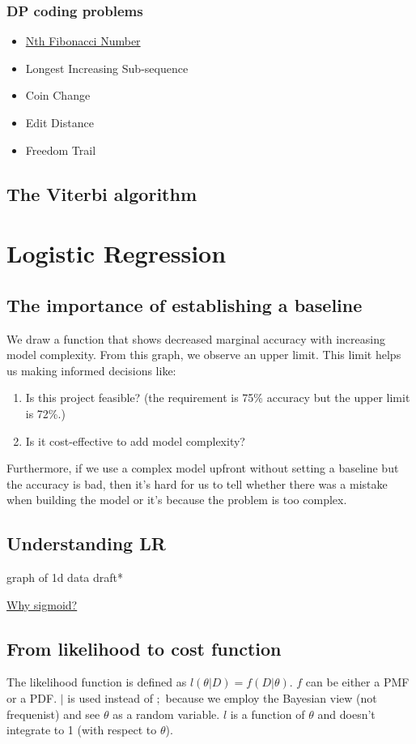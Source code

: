 \documentclass{report}
\begin{document}
  \subsection{DP coding problems}
  \begin{itemize}
	  \item \href{https://github.com/SantiDu/DSA/blob/main/DM-fibonacci_number.py}{Nth Fibonacci Number}
    \item Longest Increasing Sub-sequence
    \item Coin Change
    \item Edit Distance
    \item Freedom Trail
  \end{itemize}
  \section{The Viterbi algorithm}
  \chapter{Logistic Regression}
  \section{The importance of establishing a baseline}
  We draw a function that shows decreased marginal accuracy with increasing model complexity. From this graph, we observe an upper limit. This limit helps us making informed decisions like:
		\begin{enumerate}
			\item Is this project feasible? (the requirement is 75\% accuracy but the upper limit is 72\%.)
			\item Is it cost-effective to add model complexity?
		\end{enumerate}
Furthermore, if we use a complex model upfront without setting a baseline but the accuracy is bad, then it's hard for us to tell whether there was a mistake when building the model or it's because the problem is too complex.

  \section{Understanding LR}
  graph of 1d data draft*

  \href{https://towardsdatascience.com/why-sigmoid-a-probabilistic-perspective-42751d82686}{Why sigmoid?}
  \section{From likelihood to cost function}
  The likelihood function is defined as $l\left( \theta|D \right) = f\left( D|\theta\right) $. $f$ can be either a PMF or a PDF. $|$ is used instead of $;$ because we employ the Bayesian view (not frequenist) and see $\theta$ as a random variable. $l$ is a function of $\theta$ and doesn't integrate to 1 (with respect to $\theta$).
\end{document}
